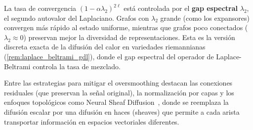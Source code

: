 \begin{remark}\label{rem:oversmoothing_geometrico}
	La tasa de convergencia $(1-\alpha\lambda_2)^{2\ell}$ está controlada por el \textbf{gap espectral} $\lambda_2$, el segundo autovalor del Laplaciano. Grafos con $\lambda_2$ grande (como los expansores) convergen más rápido al estado uniforme, mientras que grafos poco conectados ($\lambda_2 \approx 0$) preservan mejor la diversidad de representaciones. Esta es la versión discreta exacta de la difusión del calor en variedades riemannianas (\autoref{rem:laplace_beltrami_gdl}), donde el gap espectral del operador de Laplace-Beltrami controla la tasa de mezclado.

	Entre las estrategias para mitigar el \gls{oversmoothing} destacan las conexiones residuales (que preservan la señal original), la normalización por capas y los enfoques topológicos como Neural Sheaf Diffusion~\citep{bodnar2022neural}, donde se reemplaza la difusión escalar por una difusión en haces (sheaves) que permite a cada arista transportar información en espacios vectoriales diferentes.
\end{remark}

